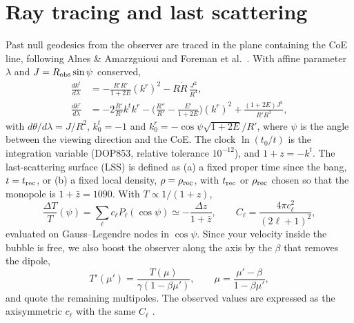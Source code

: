 \documentclass[10pt,twocolumn,letterpaper]{article}
\begin{document}
\section{Ray tracing and last scattering}
Past null geodesics from the observer are traced in the plane containing the CoE line, following Alnes \& Amarzguioui \cite{Alnes2006} and Foreman et al.\ \cite{Foreman2010}. With affine parameter $\lambda$ and $J=R_{\rm obs}\sin\psi$ conserved,
\begin{equation}\label{eq:geo}
\begin{aligned}
\frac{dk^t}{d\lambda}&=-\frac{R'\dot R'}{1+2E}(k^r)^2-R\dot R\,\frac{J^2}{R^4},\\
\frac{dk^r}{d\lambda}&=-2\frac{\dot R'}{R'}k^tk^r-\Big(\frac{R''}{R'}-\frac{E'}{1+2E}\Big)(k^r)^2+\frac{(1+2E)J^2}{R'R^3},
\end{aligned}
\end{equation}
with $d\theta/d\lambda=J/R^2$, $k^t_0=-1$ and $k^r_0=-\cos\psi\sqrt{1+2E}/R'$, where $\psi$ is the angle between the viewing direction and the CoE. The clock $\ln(t_0/t)$ is the integration variable (DOP853, relative tolerance $10^{-12}$), and $1+z=-k^t$. The last-scattering surface (LSS) is defined as (a) a fixed proper time since the bang, $t=t_{\rm rec}$, or (b) a fixed local density, $\rho=\rho_{\rm rec}$, with $t_{\rm rec}$ or $\rho_{\rm rec}$ chosen so that the monopole is $1+\bar z=1090$. With $T\propto1/(1+z)$,
\begin{equation}\label{eq:leg}
\frac{\Delta T}{T}(\psi)=\sum_\ell c_\ell P_\ell(\cos\psi)\simeq-\frac{\Delta z}{1+\bar z},\qquad C_\ell=\frac{4\pi c_\ell^2}{(2\ell+1)^2},
\end{equation}
evaluated on Gauss--Legendre nodes in $\cos\psi$. Since your velocity inside the bubble is free, we also boost the observer along the axis by the $\beta$ that removes the dipole,
\begin{equation}\label{eq:boost}
T'(\mu')=\frac{T(\mu)}{\gamma(1-\beta\mu')},\qquad \mu=\frac{\mu'-\beta}{1-\beta\mu'},
\end{equation}
and quote the remaining multipoles. The observed values are expressed as the axisymmetric $c_\ell$ with the same $C_\ell$ \cite{Planck2018I,Planck2018V}.
\end{document}
